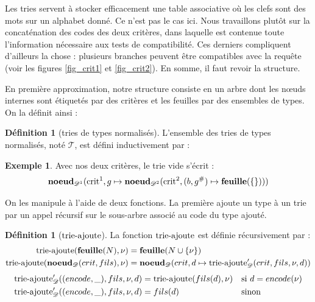 \documentclass[a4paper]{report}
\theoremstyle{definition}
\newtheorem{definition}[theoreme]{Définition}
\newtheorem{exemple}[theoreme]{Exemple}
\newcommand{\N}{\mathrm{N}}
\newcommand{\mathhyphen}{{\hbox{-}}}
\begin{document}
Les tries servent à stocker efficacement une table associative où les clefs sont des mots sur un alphabet donné. Ce n'est pas le cas ici. Nous travaillons plutôt sur la concaténation des codes des deux critères, dans laquelle est contenue toute l'information nécessaire aux tests de compatibilité. Ces derniers compliquent d'ailleurs la chose : plusieurs branches peuvent être compatibles avec la requête (voir les figures \ref{fig_crit1} et \ref{fig_crit2}). En somme, il faut revoir la structure.

En première approximation, notre structure consiste en un arbre dont les nœuds internes sont étiquetés par des critères et les feuilles par des ensembles de types. On la définit ainsi :

\begin{definition}[tries de types normalisés]
  L'ensemble des tries de types normalisés, noté $\mathscr{T}$, est défini inductivement par :
\end{definition}

\begin{exemple}
  Avec nos deux critères, le trie vide s'écrit : \\
  \[ \bold{noeud}_{\mathscr{D}^1} (\mathrm{crit}^1, g \mapsto \bold{noeud}_{\mathscr{D}^2} (\mathrm{crit}^2, (b, g^\#) \mapsto \bold{feuille} (\{ \}))) \]
\end{exemple}

On les manipule à l'aide de deux fonctions. La première ajoute un type à un trie par un appel récursif sur le sous-arbre associé au code du type ajouté.

\begin{definition}[$\mathrm{trie\mathhyphen ajoute}$]
  La fonction $\mathrm{trie\mathhyphen ajoute}$ est définie récursivement par :
  \begin{align*}
      \mathrm{trie\mathhyphen ajoute} (\bold{feuille} (N), \nu) &=
      \bold{feuille} (N \cup \{ \nu \})
    \\
      \mathrm{trie\mathhyphen ajoute} (\bold{noeud}_\mathscr{D} (crit, fils), \nu) &=
      \bold{noeud}_\mathscr{D} (crit, d \mapsto \mathrm{trie\mathhyphen ajoute}_\mathscr{D}' (crit, fils, \nu, d))
  \end{align*}
  \begin{align*}
      \mathrm{trie\mathhyphen ajoute}_\mathscr{D}' ((encode, \_), fils, \nu, d) &=
      \mathrm{trie\mathhyphen ajoute} (fils (d), \nu) &&
      \text{si } d = encode (\nu)
    \\
      \mathrm{trie\mathhyphen ajoute}_\mathscr{D}' ((encode, \_), fils, \nu, d) &=
      fils (d) &&
      \text{sinon}
  \end{align*}
\end{definition}
\end{document}
